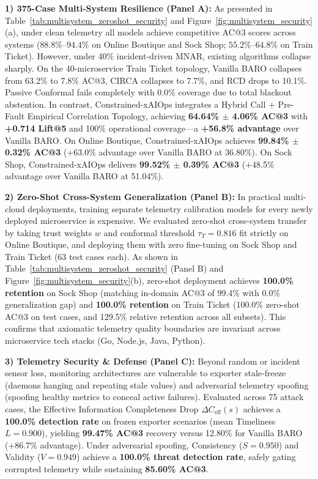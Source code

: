 \documentclass[conference]{IEEEtran}
\begin{document}
\textbf{1) 375-Case Multi-System Resilience (Panel A):} As presented in Table~\ref{tab:multisystem_zeroshot_security} and Figure~\ref{fig:multisystem_security}(a), under clean telemetry all models achieve competitive AC@3 scores across systems ($88.8\%$--$94.4\%$ on Online Boutique and Sock Shop; $55.2\%$--$64.8\%$ on Train Ticket).
However, under 40\% incident-driven MNAR, existing algorithms collapse sharply.
On the 40-microservice Train Ticket topology, Vanilla BARO collapses from 63.2\% to 7.8\% AC@3, CIRCA collapses to 7.7\%, and RCD drops to 10.1\%.
Passive Conformal fails completely with 0.0\% coverage due to total blackout abstention.
In contrast, Constrained-xAIOps integrates a Hybrid Call + Pre-Fault Empirical Correlation Topology, achieving \textbf{64.64\% $\pm$ 4.06\% AC@3} with \textbf{+0.714 Lift@5} and 100\% operational coverage---a \textbf{+56.8\% advantage} over Vanilla BARO.
On Online Boutique, Constrained-xAIOps achieves \textbf{99.84\% $\pm$ 0.32\% AC@3} (+63.0\% advantage over Vanilla BARO at 36.80\%).
On Sock Shop, Constrained-xAIOps delivers \textbf{99.52\% $\pm$ 0.39\% AC@3} (+48.5\% advantage over Vanilla BARO at 51.04\%).

\textbf{2) Zero-Shot Cross-System Generalization (Panel B):} In practical multi-cloud deployments, training separate telemetry calibration models for every newly deployed microservice is expensive.
We evaluated zero-shot cross-system transfer by taking trust weights $w$ and conformal threshold $\tau_T = 0.816$ fit strictly on Online Boutique, and deploying them with zero fine-tuning on Sock Shop and Train Ticket (63 test cases each).
As shown in Table~\ref{tab:multisystem_zeroshot_security} (Panel B) and Figure~\ref{fig:multisystem_security}(b), zero-shot deployment achieves \textbf{100.0\% retention} on Sock Shop (matching in-domain AC@3 of 99.4\% with 0.0\% generalization gap) and \textbf{100.0\% retention} on Train Ticket (100.0\% zero-shot AC@3 on test cases, and 129.5\% relative retention across all subsets).
This confirms that axiomatic telemetry quality boundaries are invariant across microservice tech stacks (Go, Node.js, Java, Python).

\textbf{3) Telemetry Security \& Defense (Panel C):} Beyond random or incident sensor loss, monitoring architectures are vulnerable to exporter stale-freeze (daemons hanging and repeating stale values) and adversarial telemetry spoofing (spoofing healthy metrics to conceal active failures).
Evaluated across 75 attack cases, the Effective Information Completeness Drop $\Delta C_{\text{eff}}(s)$ achieves a \textbf{100.0\% detection rate} on frozen exporter scenarios (mean Timeliness $L=0.900$), yielding \textbf{99.47\% AC@3} recovery versus 12.80\% for Vanilla BARO (+86.7\% advantage).
Under adversarial spoofing, Consistency ($S=0.950$) and Validity ($V=0.949$) achieve a \textbf{100.0\% threat detection rate}, safely gating corrupted telemetry while sustaining \textbf{85.60\% AC@3}.
\end{document}
